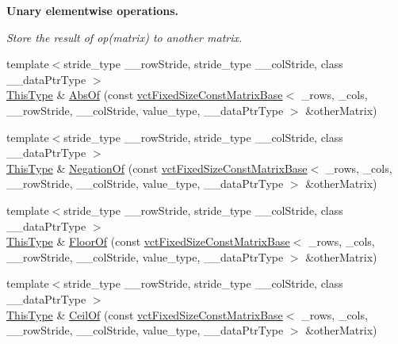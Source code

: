\begin{Indent}{\bf Unary elementwise operations.}\par
{\em Store the result of op(matrix) to another matrix. }\begin{DoxyCompactItemize}
\item 
{\footnotesize template$<$stride\-\_\-type \-\_\-\-\_\-row\-Stride, stride\-\_\-type \-\_\-\-\_\-col\-Stride, class \-\_\-\-\_\-data\-Ptr\-Type $>$ }\\\hyperlink{classvct_fixed_size_const_matrix_base_a7ec66a96ed7e08ce9ff54093133c9d8d}{This\-Type} \& \hyperlink{classvct_fixed_size_matrix_base_a913ff6b2c7525f9a5e8d757dc00e5150}{Abs\-Of} (const \hyperlink{classvct_fixed_size_const_matrix_base}{vct\-Fixed\-Size\-Const\-Matrix\-Base}$<$ \-\_\-rows, \-\_\-cols, \-\_\-\-\_\-row\-Stride, \-\_\-\-\_\-col\-Stride, value\-\_\-type, \-\_\-\-\_\-data\-Ptr\-Type $>$ \&other\-Matrix)
\item 
{\footnotesize template$<$stride\-\_\-type \-\_\-\-\_\-row\-Stride, stride\-\_\-type \-\_\-\-\_\-col\-Stride, class \-\_\-\-\_\-data\-Ptr\-Type $>$ }\\\hyperlink{classvct_fixed_size_const_matrix_base_a7ec66a96ed7e08ce9ff54093133c9d8d}{This\-Type} \& \hyperlink{classvct_fixed_size_matrix_base_a62706711a47b193fac3b8a933c887d9c}{Negation\-Of} (const \hyperlink{classvct_fixed_size_const_matrix_base}{vct\-Fixed\-Size\-Const\-Matrix\-Base}$<$ \-\_\-rows, \-\_\-cols, \-\_\-\-\_\-row\-Stride, \-\_\-\-\_\-col\-Stride, value\-\_\-type, \-\_\-\-\_\-data\-Ptr\-Type $>$ \&other\-Matrix)
\item 
{\footnotesize template$<$stride\-\_\-type \-\_\-\-\_\-row\-Stride, stride\-\_\-type \-\_\-\-\_\-col\-Stride, class \-\_\-\-\_\-data\-Ptr\-Type $>$ }\\\hyperlink{classvct_fixed_size_const_matrix_base_a7ec66a96ed7e08ce9ff54093133c9d8d}{This\-Type} \& \hyperlink{classvct_fixed_size_matrix_base_a2d72f53871e40f435986c4f6e4c2f423}{Floor\-Of} (const \hyperlink{classvct_fixed_size_const_matrix_base}{vct\-Fixed\-Size\-Const\-Matrix\-Base}$<$ \-\_\-rows, \-\_\-cols, \-\_\-\-\_\-row\-Stride, \-\_\-\-\_\-col\-Stride, value\-\_\-type, \-\_\-\-\_\-data\-Ptr\-Type $>$ \&other\-Matrix)
\item 
{\footnotesize template$<$stride\-\_\-type \-\_\-\-\_\-row\-Stride, stride\-\_\-type \-\_\-\-\_\-col\-Stride, class \-\_\-\-\_\-data\-Ptr\-Type $>$ }\\\hyperlink{classvct_fixed_size_const_matrix_base_a7ec66a96ed7e08ce9ff54093133c9d8d}{This\-Type} \& \hyperlink{classvct_fixed_size_matrix_base_ae7821d82b5e2a678775a4dad933e9d01}{Ceil\-Of} (const \hyperlink{classvct_fixed_size_const_matrix_base}{vct\-Fixed\-Size\-Const\-Matrix\-Base}$<$ \-\_\-rows, \-\_\-cols, \-\_\-\-\_\-row\-Stride, \-\_\-\-\_\-col\-Stride, value\-\_\-type, \-\_\-\-\_\-data\-Ptr\-Type $>$ \&other\-Matrix)
\end{DoxyCompactItemize}
\end{Indent}
